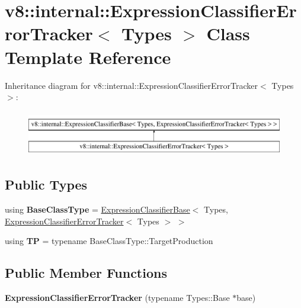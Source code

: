 \hypertarget{classv8_1_1internal_1_1ExpressionClassifierErrorTracker}{}\section{v8\+:\+:internal\+:\+:Expression\+Classifier\+Error\+Tracker$<$ Types $>$ Class Template Reference}
\label{classv8_1_1internal_1_1ExpressionClassifierErrorTracker}
Inheritance diagram for v8\+:\+:internal\+:\+:Expression\+Classifier\+Error\+Tracker$<$ Types $>$\+:\begin{figure}[H]
\begin{center}
\leavevmode
\includegraphics[height=2.000000cm]{classv8_1_1internal_1_1ExpressionClassifierErrorTracker}
\end{center}
\end{figure}
\subsection*{Public Types}
\begin{DoxyCompactItemize}
\item 
\mbox{\label{classv8_1_1internal_1_1ExpressionClassifierErrorTracker_af27efde3711783ea657764dad9ed2d11}} 
using {\bfseries Base\+Class\+Type} = \mbox{\hyperlink{classv8_1_1internal_1_1ExpressionClassifierBase}{Expression\+Classifier\+Base}}$<$ Types, \mbox{\hyperlink{classv8_1_1internal_1_1ExpressionClassifierErrorTracker}{Expression\+Classifier\+Error\+Tracker}}$<$ Types $>$ $>$
\item 
\mbox{\label{classv8_1_1internal_1_1ExpressionClassifierErrorTracker_ac4b3c180b655af33bd9dffb613d75596}} 
using {\bfseries TP} = typename Base\+Class\+Type\+::\+Target\+Production
\end{DoxyCompactItemize}
\subsection*{Public Member Functions}
\begin{DoxyCompactItemize}
\item 
\mbox{\label{classv8_1_1internal_1_1ExpressionClassifierErrorTracker_accd52c2fddbf4d4b6cea34522b4b5d72}} 
{\bfseries Expression\+Classifier\+Error\+Tracker} (typename Types\+::\+Base $\ast$base)
\end{DoxyCompactItemize}
